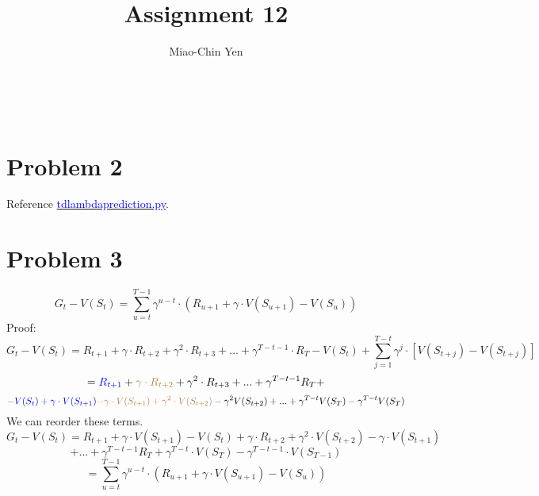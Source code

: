 \documentclass{article}
\title{Assignment 12}
\author{Miao-Chin Yen}
\begin{document}
\maketitle
\
\section*{Problem 2}

Reference \href{https://github.com/miaochin/RL-book/tree/master/CME241_assignments/assignment12}{\textcolor{blue}{td\textunderscore lambda\textunderscore prediction.py}}.
\section*{Problem 3}
$$G_{t}-V\left(S_{t}\right)=\sum_{u=t}^{T-1} \gamma^{u-t} \cdot\left(R_{u+1}+\gamma \cdot V\left(S_{u+1}\right)-V\left(S_{u}\right)\right)$$
Proof:\\
$$G_{t}-V(S_{t}) = R_{t+1}+\gamma \cdot R_{t+2}+\gamma^{2} \cdot R_{t+3}+...+\gamma^{T-t-1} \cdot R_{T} - V(S_{t})+ \sum_{j=1}^{T-t} \gamma^{j} \cdot [V(S_{t+j})-V(S_{t+j})]$$
$$= \textcolor{blue}{R_{t+1}}+ \textcolor{brown}{\gamma \cdot R_{t+2}}+\gamma^{2} \cdot R_{t+3}+...+\gamma^{T-t-1} R_{T} + $$
$$ 
\textcolor{blue}{-V(S_{t})+\gamma \cdot V(S_{t+1})} \textcolor{brown}{-\gamma \cdot V(S_{t+1}) + \gamma^{2} \cdot  V(S_{t+2}) }-\gamma^{2} V(S_{t+2}) + ... + \gamma^{T-t}V(S_{T})- \gamma^{T-t}V(S_{T})$$
We can reorder these terms.
$$G_{t}-V(S_{t}) = R_{t+1} + \gamma\cdot V(S_{t+1})-V(S_{t}) + \gamma \cdot R_{t+2} + \gamma^{2}\cdot V(S_{t+2})-\gamma\cdot V(S_{t+1})$$
$$+ ... +\gamma^{T-t-1} R_{T} + \gamma^{T-t}\cdot V(S_{T})-\gamma^{T-t-1}\cdot V(S_{T-1})$$
$$=\sum_{u=t}^{T-1} \gamma^{u-t} \cdot\left(R_{u+1}+\gamma \cdot V\left(S_{u+1}\right)-V\left(S_{u}\right)\right)$$
\end{document}
